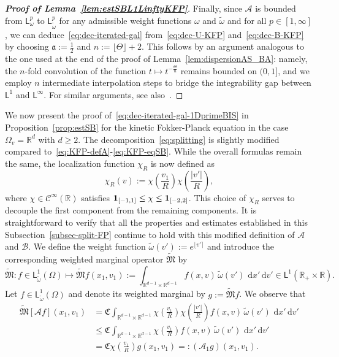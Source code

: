 \documentclass[11pt]{amsart}
\theoremstyle{definition}
\theoremstyle{remark}
\numberwithin{equation}{section}
\newcommand\R{{\mathbb R}}
\def\AA{{\mathcal A}}
\def\BB{{\mathcal B}}
\def\fM{{\mathfrak M}}
\newcommand{\dd}{{\, \mathrm d}}
\newcommand{\sfL}{\mathsf{L}}
\newcommand{\wangle}[1]{\lfloor #1 \rceil}
\begin{document}
\begin{proof}[{\bf Proof of Lemma~\ref{lem:estSBL1LinftyKFP}}]
Finally, since $\AA$ is bounded from $\sfL^p_\omega$ to $\sfL^p_{\tilde \omega}$ for any admissible weight functions $\omega$ and $\tilde \omega$ and for all $p \in [1, \infty]$, we can deduce~\eqref{eq:dec-iterated-gal} from~\eqref{eq:dec-U-KFP} and~\eqref{eq:dec-B-KFP} by choosing $\mathfrak{a} := \frac{1}{2}$ and $n := \lfloor \Theta \rfloor + 2$. This follows by an argument analogous to the one used at the end of the proof of Lemma~\ref{lem:dispersionAS_BA}: namely, the $n$-fold convolution of the function $t \mapsto t^{-\frac{\Theta}{n}}$ remains bounded on $(0,1]$, and we employ $n$ intermediate interpolation steps to bridge the integrability gap between $\sfL^1$ and $\sfL^\infty$. For similar arguments, see also~\cite{MR3779780,MR3465438}.
\end{proof}

We now present the proof of~\eqref{eq:dec-iterated-gal-1DprimeBIS} in Proposition~\ref{prop:estSB} for the kinetic Fokker-Planck equation in the case $\Omega_v = \mathbb{R}^d$ with $d \geq 2$. The decomposition~\eqref{eq:splitting} is slightly modified compared to~\eqref{eq:KFP-defA}-\eqref{eq:KFP-eqSB}. While the overall formulas remain the same, the localization function $\chi_R$ is now defined as
\begin{equation*}
  \chi_R(v) := \chi\left(\frac{v_1}{R}\right) \chi\left(\frac{|v'|}{R}\right),
\end{equation*}
where $\chi \in \mathcal{C}^\infty(\R)$ satisfies ${\bf 1}_{[-1,1]} \leq \chi \leq {\bf 1}_{[-2,2]}$. This choice of $\chi_R$ serves to decouple the first component from the remaining components. It is straightforward to verify that all the properties and estimates established in this Subsection~\ref{subsec-split-FP} continue to hold with this modified definition of $\AA$ and $\BB$. We define the weight function $\tilde \omega(v') := e^{\wangle{v'}}$ and introduce the corresponding weighted marginal operator $\tilde \fM$ by
\begin{equation*}
  \tilde \fM : f \in \sfL^1_{\tilde \omega}(\Omega) \mapsto \tilde \fM f(x_1,v_1) := \int_{\R^{d-1} \times \R^{d-1}} f(x,v)\, \tilde \omega(v')\, \dd x'\dd v' \in \sfL^1(\R_+ \times \R).
\end{equation*}
Let $f \in \sfL^1_{\tilde \omega}(\Omega)$ and denote its weighted marginal by $g := \tilde \fM f$. We observe that
\begin{align*}
  \tilde \fM [\AA f](x_1,v_1)
  &= \mathfrak{C} \int_{\R^{d-1} \times \R^{d-1}} \chi\left(\frac{v_1}{R}\right) \chi\left(\frac{|v'|}{R}\right) f(x,v)\, \tilde \omega(v')\, \dd x'\dd v' \\
  &\leq \mathfrak{C} \int_{\R^{d-1} \times \R^{d-1}} \chi\left(\frac{v_1}{R}\right) f(x,v)\, \tilde \omega(v')\, \dd x'\dd v' \\
  &= \mathfrak{C} \chi\left(\frac{v_1}{R}\right) g(x_1,v_1) =: (\AA_1 g)(x_1,v_1).
\end{align*}
\end{document}
